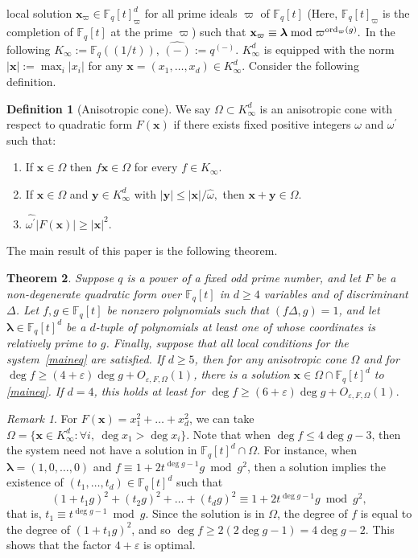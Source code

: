\documentclass[11pt]{amsart}
\theoremstyle{plain}
\theoremstyle{plain}
\newtheorem{theorem}{Theorem}[section]
\renewcommand{\vec}[1]{\mathbf{#1}}
\theoremstyle{remark}
\newtheorem{remark}[equation]{Remark}
\theoremstyle{definition}
\newtheorem{definition}[theorem]{Definition}
\newcommand{\ord}{\textup{ord}}
\renewcommand{\hat}{\widehat}
\begin{document}
local solution $\vec{x}_{\varpi} \in  {\mathbb{F}_q[t]}_{\varpi}^d$ for all prime ideals  $\varpi$ of  $\mathbb{F}_q[t]$ (Here, $\mathbb{F}_q[t]_{\varpi}$ is the completion of $\mathbb{F}_q[t]$ at the prime $\varpi$) such that $\vec{x}_{\varpi}\equiv\boldsymbol{\lambda}\bmod \varpi^{\ord_{\varpi}(g)}.$ In the following $K_{\infty}:=\mathbb{F}_q(\!(1/t)\!)$, $\widehat{(-)}:=q^{(-)}$. $K_{\infty}^d$ is equipped with the norm $|\vec{x}|:=\max_i|x_i|$ for any $\vec{x}=(x_1,\hdots,x_d)\in K_{\infty}^d$. Consider the following definition.
\begin{definition}[Anisotropic cone]\label{def:aniso}We say $\Omega\subset K_{\infty}^d$ is an anisotropic cone with respect to quadratic form $F(\vec{x})$ if there exists fixed positive integers $\omega$  and  $\omega^{\prime}$ such that: 

\begin{enumerate}
\item If $\vec{x}\in \Omega$ then $f\vec{x}\in \Omega$ for every $f\in K_\infty.$
\item \label{prop2} If $\vec{x}\in\Omega$ and $\vec{y} \in  K_\infty^d $ with $|\vec{y}|\leq |\vec{x}|/ \hat{\omega},$ then $\vec{x}+\vec{y} \in \Omega.$ 
\item \label{prop3}  $ \hat{\omega^{\prime}} |F(\vec{x})| \geq |\vec{x}|^2.$
\end{enumerate}
\end{definition}
The main result of this paper is the following theorem.
\begin{theorem}
\label{mainthm}Suppose $q$ is a power of a fixed odd prime number, and let $F$ be a non-degenerate quadratic form over $\mathbb{F}_q[t]$ in $d\geq 4$ variables and of discriminant $\Delta$. Let $f, g\in\mathbb{F}_q[t]$ be nonzero polynomials such that $(f\Delta,g)=1$, and let $\boldsymbol{\lambda}\in\mathbb{F}_q[t]^d$ be a $d$-tuple of polynomials at least one of whose coordinates is relatively prime to $g$. Finally, suppose that 
all local conditions for the system~\eqref{maineq}
are satisfied.  If $d\geq 5$, then for any anisotropic cone $\Omega$ and for $\deg f \geq (4+\varepsilon)\deg g +O_{\varepsilon,F,\Omega}(1)$,  there is a solution $\vec{x} \in \Omega\cap\mathbb{F}_q[t]^d $ to \eqref{maineq}. If $d=4$, this holds at least for $\deg f \geq (6+\varepsilon)\deg g +O_{\varepsilon,F,\Omega}(1).$
 \end{theorem}
\begin{remark}\label{optimality}For $F(\vec{x})=x_1^2+\hdots+x_d^2$, we can take $\Omega=\{\vec{x}\in K_{\infty}^d:\forall i,\ \deg x_1>\deg x_i\}$. Note that when $\deg f\leq 4\deg g-3$, then the system need not have a solution in $\mathbb{F}_q[t]^d\cap\Omega$. For instance, when $\boldsymbol{\lambda}=(1,0,\hdots,0)$ and $f\equiv 1+2t^{\deg g -1}g\bmod g^2$, then a solution implies the existence of $(t_1,\hdots,t_d)\in\mathbb{F}_q[t]^d$ such that
\[(1+t_1g)^2+(t_2g)^2+\hdots+(t_dg)^2\equiv 1+2t^{\deg g-1}g\bmod g^2, \]
that is, $t_1\equiv t^{\deg g-1}\bmod g$. Since the solution is in $\Omega$, the degree of $f$ is equal to the degree of $(1+t_1g)^2$, and so $\deg f\geq 2(2\deg g-1)=4\deg g-2$. This shows that the factor $4+\varepsilon$ is optimal.
\end{remark}
\end{document}
